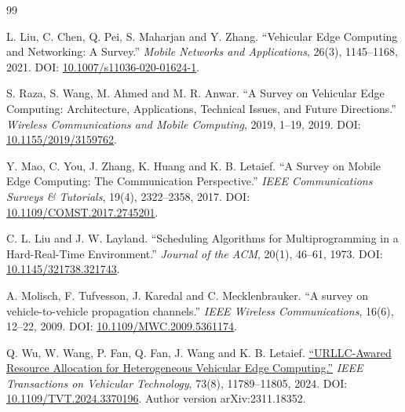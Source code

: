 \documentclass[12pt,a4paper]{article}
\begin{document}
\FloatBarrier\singlespacing{}\begin{thebibliography}{99}
\setlength{\itemsep}{0pt}\setlength{\parskip}{0pt}

 L. Liu, C. Chen, Q. Pei, S. Maharjan and Y. Zhang. ``Vehicular Edge Computing and Networking: A Survey.'' \emph{Mobile Networks and Applications}, 26(3), 1145--1168, 2021. DOI: \href{\detokenize{https://doi.org/10.1007/s11036-020-01624-1}}{10.1007/s11036-020-01624-1}.

 S. Raza, S. Wang, M. Ahmed and M. R. Anwar. ``A Survey on Vehicular Edge Computing: Architecture, Applications, Technical Issues, and Future Directions.'' \emph{Wireless Communications and Mobile Computing}, 2019, 1--19, 2019. DOI: \href{\detokenize{https://doi.org/10.1155/2019/3159762}}{10.1155/2019/3159762}.

 Y. Mao, C. You, J. Zhang, K. Huang and K. B. Letaief. ``A Survey on Mobile Edge Computing: The Communication Perspective.'' \emph{IEEE Communications Surveys \& Tutorials}, 19(4), 2322--2358, 2017. DOI: \href{\detokenize{https://arxiv.org/abs/1701.01090}}{10.1109/COMST.2017.2745201}.

 C. L. Liu and J. W. Layland. ``Scheduling Algorithms for Multiprogramming in a Hard-Real-Time Environment.'' \emph{Journal of the ACM}, 20(1), 46--61, 1973. DOI: \href{\detokenize{https://doi.org/10.1145/321738.321743}}{10.1145/321738.321743}.

 A. Molisch, F. Tufvesson, J. Karedal and C. Mecklenbrauker. ``A survey on vehicle-to-vehicle propagation channels.'' \emph{IEEE Wireless Communications}, 16(6), 12--22, 2009. DOI: \href{\detokenize{https://doi.org/10.1109/MWC.2009.5361174}}{10.1109/MWC.2009.5361174}.

 Q. Wu, W. Wang, P. Fan, Q. Fan, J. Wang and K. B. Letaief. \href{\detokenize{https://arxiv.org/abs/2311.18352}}{``URLLC-Awared Resource Allocation for Heterogeneous Vehicular Edge Computing.''} \emph{IEEE Transactions on Vehicular Technology}, 73(8), 11789--11805, 2024. DOI: \href{\detokenize{https://doi.org/10.1109/TVT.2024.3370196}}{10.1109/TVT.2024.3370196}. Author version arXiv:2311.18352.


\end{thebibliography}
\end{document}
